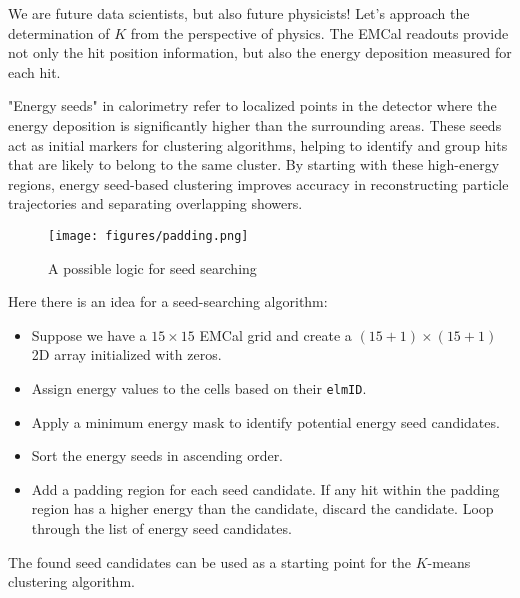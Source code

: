 \documentclass[a4paper,12pt]{article}
\begin{document}
We are future data scientists, but also future physicists!
Let's approach the determination of \(K\) from the perspective of physics.
The EMCal readouts provide not only the hit position information, but also the energy deposition measured for each hit.

"Energy seeds" in calorimetry refer to localized points in the detector where the energy deposition is significantly higher than the surrounding areas. These seeds act as initial markers for clustering algorithms, helping to identify and group hits that are likely to belong to the same cluster. By starting with these high-energy regions, energy seed-based clustering improves accuracy in reconstructing particle trajectories and separating overlapping showers.

\begin{figure}[h]
    \centering
    \texttt{[image: figures/padding.png]}
    \caption{A possible logic for seed searching}
\end{figure}

Here there is an idea for a seed-searching algorithm:
\begin{itemize}
    \item Suppose we have a \( 15 \times 15 \) EMCal grid and create a \( (15+1) \times (15+1) \) 2D array initialized with zeros.
    \item Assign energy values to the cells based on their \texttt{elmID}.
    \item Apply a minimum energy mask to identify potential energy seed candidates.
    \item Sort the energy seeds in ascending order.
    \item Add a padding region for each seed candidate. If any hit within the padding region has a higher energy than the candidate, discard the candidate. Loop through the list of energy seed candidates.
\end{itemize}

The found seed candidates can be used as a starting point for the $K$-means clustering algorithm.
\end{document}
